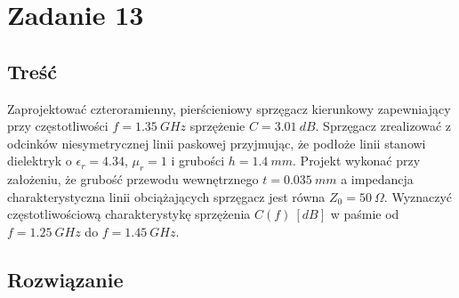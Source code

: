 \documentclass[rep.tex]{subfiles}
\begin{document}
\chapter{Zadanie 13}
\label{zad13}
\section{Treść}
Zaprojektować czteroramienny, pierścieniowy sprzęgacz kierunkowy zapewniający przy
częstotliwości $f = 1.35~GHz$ sprzężenie $C = 3.01~dB$.
Sprzęgacz zrealizować z odcinków niesymetrycznej linii paskowej przyjmując,
że podłoże linii stanowi dielektryk o $\epsilon_r = 4.34$, $\mu_r = 1$ i grubości $h = 1.4~mm$.
Projekt wykonać przy założeniu, że grubość przewodu wewnętrznego $t = 0.035~mm$ a impedancja charakterystyczna linii obciążających sprzęgacz jest równa $Z_0 = 50~\Omega$.
Wyznaczyć częstotliwościową charakterystykę sprzężenia $C(f)~[dB]$ w paśmie od $f = 1.25~GHz$ do $f = 1.45~GHz$.

\section{Rozwiązanie}
\end{document}

